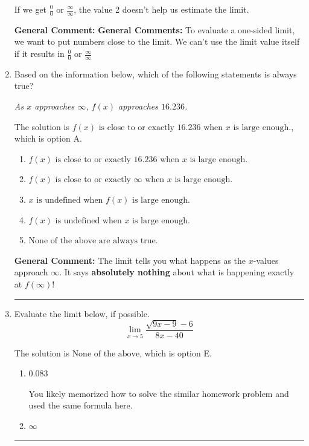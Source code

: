 \documentclass{extbook}[14pt]
\newcommand{\litem}[1]{\item #1

\rule{\textwidth}{0.4pt}}
\begin{document}
\begin{enumerate}
{\begin{enumerate}[label=\Alph*.]
If we get $\frac{0}{0}$ or $\frac{\infty}{\infty}$, the value 2 doesn't help us estimate the limit.
\end{enumerate}

\textbf{General Comment:} \textbf{General Comments:} To evaluate a one-sided limit, we want to put numbers close to the limit. We can't use the limit value itself if it results in $\frac{0}{0}$ or $\frac{\infty}{\infty}$
}
\litem{
Based on the information below, which of the following statements is always true?

\begin{center}
    \textit{ As $x$ approaches $\infty$, $f(x)$ approaches $16.236$. }
\end{center}


The solution is \( f(x) \text{ is close to or exactly } 16.236 \text{ when } x \text{ is large enough}. \), which is option A.\begin{enumerate}[label=\Alph*.]
\item \( f(x) \text{ is close to or exactly } 16.236 \text{ when } x \text{ is large enough}. \)


\item \( f(x) \text{ is close to or exactly } \infty \text{ when } x \text{ is large enough}. \)


\item \( x \text{ is undefined when } f(x) \text{ is large enough}. \)


\item \( f(x) \text{ is undefined when } x \text{ is large enough}. \)


\item \( \text{None of the above are always true.} \)


\end{enumerate}

\textbf{General Comment:} The limit tells you what happens as the $x$-values approach $\infty$. It says \textbf{absolutely nothing} about what is happening exactly at $f(\infty)$!
}
\litem{
Evaluate the limit below, if possible.
\[ \lim_{x \rightarrow 5} \frac{\sqrt{9x - 9} - 6}{8x - 40} \]

The solution is \( \text{None of the above} \), which is option E.\begin{enumerate}[label=\Alph*.]
\item \( 0.083 \)

You likely memorized how to solve the similar homework problem and used the same formula here.
\item \( \infty \)


\end{enumerate}}
\end{enumerate}
\end{document}
